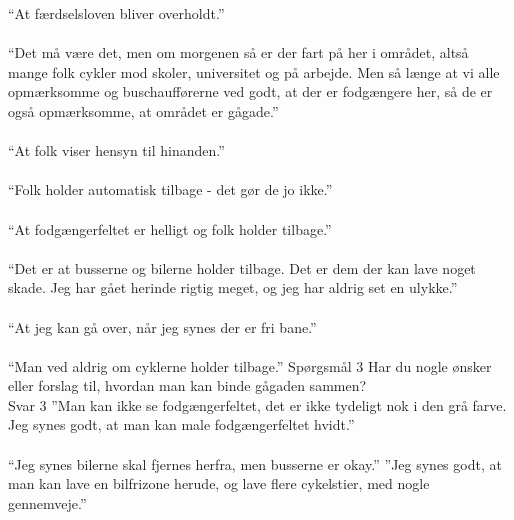 \begin{appendics}
  “At færdselsloven bliver overholdt.”
\\\\
  “Det må være det, men om morgenen så er der fart på her i området, altså mange folk cykler mod skoler, universitet og på arbejde. Men så længe at vi alle opmærksomme og buschaufførerne ved godt, at der er fodgængere her, så de er også opmærksomme, at området er gågade.”
\\\\
  “At folk viser hensyn til hinanden.”
\\\\
  “Folk holder automatisk tilbage - det gør de jo ikke.”
\\\\
  “At fodgængerfeltet er helligt og folk holder tilbage.”
\\\\
  “Det er at busserne og bilerne holder tilbage. Det er dem der kan lave noget skade. Jeg har gået herinde rigtig meget, og jeg har aldrig set en ulykke.”
\\\\
  “At jeg kan gå over, når jeg synes der er fri bane.”
\\\\
  “Man ved aldrig om cyklerne holder tilbage.”
  Spørgsmål 3
  Har du nogle ønsker eller forslag til, hvordan man kan binde gågaden sammen?
\\
  Svar 3
  ”Man kan ikke se fodgængerfeltet, det er ikke tydeligt nok i den grå farve. Jeg synes godt, at man kan male fodgængerfeltet hvidt.”
\\\\
  “Jeg synes bilerne skal fjernes herfra, men busserne er okay.”
  ”Jeg synes godt, at man kan lave en bilfrizone herude, og lave flere cykelstier, med nogle gennemveje.”
\\\\


\end{appendics}
